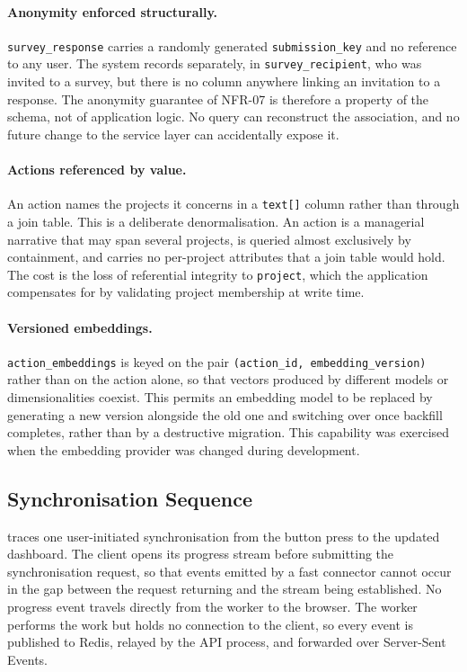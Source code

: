 \paragraph{Anonymity enforced structurally.}
\texttt{survey\_response} carries a randomly generated \texttt{submission\_key}
and no reference to any user. The system records separately, in
\texttt{survey\_recipient}, who was invited to a survey, but there is no
column anywhere linking an invitation to a response. The anonymity guarantee of
NFR-07 is therefore a property of the schema, not of application logic. No query
can reconstruct the association, and no future change to the service layer can
accidentally expose it.

\paragraph{Actions referenced by value.}
An action names the projects it concerns in a \texttt{text[]} column rather than
through a join table. This is a deliberate denormalisation. An action is a
managerial narrative that may span several projects, is queried almost
exclusively by containment, and carries no per-project attributes that a join
table would hold. The cost is the loss of referential integrity to
\texttt{project}, which the application compensates for by validating project
membership at write time.

\paragraph{Versioned embeddings.}
\texttt{action\_embeddings} is keyed on the pair
\texttt{(action\_id, embedding\_version)} rather than on the action alone, so that
vectors produced by different models or dimensionalities coexist. This permits an
embedding model to be replaced by generating a new version alongside the old one
and switching over once backfill completes, rather than by a destructive
migration. This capability was exercised when the embedding provider was
changed during development.


\subsection{Synchronisation Sequence}
\label{subsec:sync-sequence}

 traces one user-initiated synchronisation from the
button press to the updated dashboard. The client opens its progress stream before submitting
the synchronisation request, so that events emitted by a fast connector cannot
occur in the gap between the request returning and the stream being established.
No progress event travels directly from the worker to the browser. The
worker performs the work but holds no connection to the client, so every event is
published to Redis, relayed by the API process, and forwarded over Server-Sent
Events.

